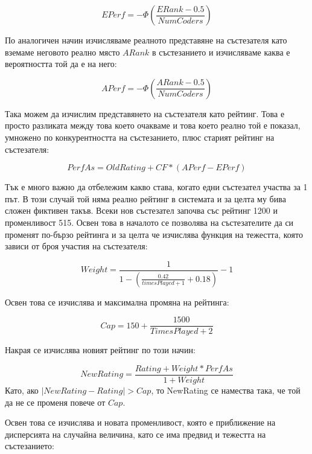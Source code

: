 \documentclass[a4paper,12pt]{article}
\begin{document}
  \begin{equation}
    EPerf=-\Phi\left(\frac{ERank - 0.5}{NumCoders}\right)
  \end{equation}
  
  По аналогичен начин изчисляваме реалното представяне на състезателя като вземаме неговото реално място \(ARank\) в състезанието и изчисляваме каква е вероятността той да е на него:

  \begin{equation}
    APerf=-\Phi\left(\frac{ARank - 0.5}{NumCoders}\right)
  \end{equation}
  
  Така можем да изчислим представянето на състезателя като рейтинг. Това е просто разликата между това което очакваме и това което реално той е показал, умножено по конкурентността на състезанието, плюс старият рейтинг на състезателя:
  
  \begin{equation}
    PerfAs = OldRating + CF*(APerf - EPerf)
  \end{equation}

  Тък е много важно да отбележим какво става, когато едни състезател участва за 1 път. В този случай той няма реално рейтинг в системата и за целта му бива сложен фиктивен такъв. Всеки нов състезател започва със рейтинг 1200 и променливост 515. Освен това в началото се позволява на състезателите да си променят по-бързо рейтинга и за целта че изчислява функция на тежестта, която зависи от броя участия на състезателя:
  
  \begin{equation}
    Weight = \frac{1}{1 - \left(\frac{0.42}{timesPlayed + 1} + 0.18\right)} - 1
  \end{equation}
  
  Освен това се изчислява и максимална промяна на рейтинга:
  
  \begin{equation}
    Cap = 150 + \frac{1500}{TimesPlayed + 2}
  \end{equation}
  
  Накрая се изчислява новият рейтинг по този начин:
  
  \begin{equation}
    NewRating = \frac{Rating + Weight * PerfAs}{1 + Weight}
  \end{equation}
  Като, ако \(|NewRating - Rating| > Cap\), то NewRating се намества така, че той да не се променя повече от \(Cap\).
  
  Освен това се изчислява и новата променливост, която е приближение на дисперсията на случайна величина, като се има предвид и тежестта на състезанието:
  
\end{document}
